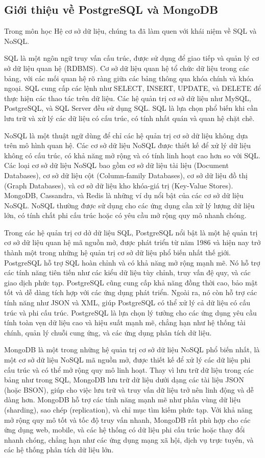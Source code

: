 \subsection{Giới thiệu về PostgreSQL và MongoDB}
Trong môn học Hệ cơ sở dữ liệu, chúng ta đã làm quen với khái niệm về SQL và NoSQL.

SQL là một ngôn ngữ truy vấn cấu trúc, được sử dụng để giao tiếp và quản lý cơ sở dữ liệu quan hệ (RDBMS). Cơ sở dữ liệu quan hệ tổ chức dữ liệu trong các bảng, với các mối quan hệ rõ ràng giữa các bảng thông qua khóa chính và khóa ngoại. SQL cung cấp các lệnh như SELECT, INSERT, UPDATE, và DELETE để thực hiện các thao tác trên dữ liệu. Các hệ quản trị cơ sở dữ liệu như MySQL, PostgreSQL, và SQL Server đều sử dụng SQL. SQL là lựa chọn phổ biến khi cần lưu trữ và xử lý các dữ liệu có cấu trúc, có tính nhất quán và quan hệ chặt chẽ.

NoSQL là một thuật ngữ dùng để chỉ các hệ quản trị cơ sở dữ liệu không dựa trên mô hình quan hệ. Các cơ sở dữ liệu NoSQL được thiết kế để xử lý dữ liệu không có cấu trúc, có khả năng mở rộng và có tính linh hoạt cao hơn so với SQL. Các loại cơ sở dữ liệu NoSQL bao gồm cơ sở dữ liệu tài liệu (Document Databases), cơ sở dữ liệu cột (Column-family Databases), cơ sở dữ liệu đồ thị (Graph Databases), và cơ sở dữ liệu kho khóa-giá trị (Key-Value Stores). MongoDB, Cassandra, và Redis là những ví dụ nổi bật của các cơ sở dữ liệu NoSQL. NoSQL thường được sử dụng cho các ứng dụng cần xử lý lượng dữ liệu lớn, có tính chất phi cấu trúc hoặc có yêu cầu mở rộng quy mô nhanh chóng.

Trong các hệ quản trị cơ dở dữ liệu SQL, PostgreSQL nổi bật là một hệ quản trị cơ sở dữ liệu quan hệ mã nguồn mở, được phát triển từ năm 1986 và hiện nay trở thành một trong những hệ quản trị cơ sở dữ liệu phổ biến nhất thế giới. PostgreSQL hỗ trợ SQL hoàn chỉnh và có khả năng mở rộng mạnh mẽ. Nó hỗ trợ các tính năng tiên tiến như các kiểu dữ liệu tùy chỉnh, truy vấn đệ quy, và các giao dịch phức tạp. PostgreSQL cũng cung cấp khả năng đồng thời cao, bảo mật tốt và dễ dàng tích hợp với các ứng dụng phát triển. Ngoài ra, nó còn hỗ trợ các tính năng như JSON và XML, giúp PostgreSQL có thể xử lý cả dữ liệu có cấu trúc và phi cấu trúc. PostgreSQL là lựa chọn lý tưởng cho các ứng dụng yêu cầu tính toàn vẹn dữ liệu cao và hiệu suất mạnh mẽ, chẳng hạn như hệ thống tài chính, quản lý chuỗi cung ứng, và các ứng dụng phân tích dữ liệu.

MongoDB là một trong những hệ quản trị cơ sở dữ liệu NoSQL phổ biến nhất, là một cơ sở dữ liệu NoSQL mã nguồn mở, được thiết kế để xử lý các dữ liệu phi cấu trúc và có thể mở rộng quy mô linh hoạt. Thay vì lưu trữ dữ liệu trong các bảng như trong SQL, MongoDB lưu trữ dữ liệu dưới dạng các tài liệu JSON (hoặc BSON), giúp cho việc lưu trữ và truy vấn dữ liệu trở nên linh động và dễ dàng hơn. MongoDB hỗ trợ các tính năng mạnh mẽ như phân vùng dữ liệu (sharding), sao chép (replication), và chỉ mục tìm kiếm phức tạp. Với khả năng mở rộng quy mô tốt và tốc độ truy vấn nhanh, MongoDB rất phù hợp cho các ứng dụng web, mobile, và các hệ thống có dữ liệu phi cấu trúc hoặc thay đổi nhanh chóng, chẳng hạn như các ứng dụng mạng xã hội, dịch vụ trực tuyến, và các hệ thống phân tích dữ liệu lớn.


